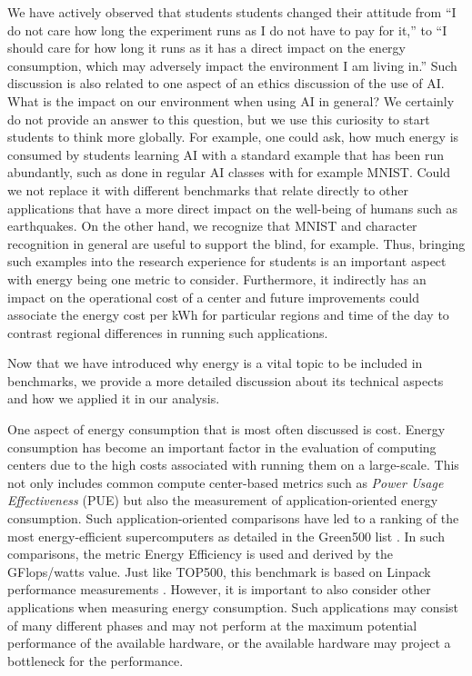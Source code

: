 \documentclass[utf8]{FrontiersinVancouver} %
\begin{document}
We have actively observed that students 
students changed their attitude from ``I do not care how long the experiment runs as I do not have to pay for it,'' to ``I should care for how long it runs as it has a direct impact on the energy consumption, which may adversely impact the environment I am living in.''
Such discussion is also related to one aspect of an ethics discussion of the use of AI. What is the impact on our environment when using AI in general? We certainly do not provide an answer to this question, but we use this curiosity to start students to think more globally. For example, one could ask, how much energy is consumed by students learning AI with a standard example that has been run abundantly, such as done in regular AI classes with for example MNIST. Could we not replace it with different benchmarks that relate directly to other applications that have a more direct impact on the well-being of humans such as earthquakes. On the other hand, we recognize that MNIST and character recognition in general are useful to support the blind, for example. Thus, bringing such examples into the research experience for students is an important aspect with energy being one metric to consider. Furthermore, it indirectly has an impact on the operational cost of a center and future improvements could associate the energy cost per kWh for particular regions and time of the day to contrast regional differences in running such applications.
 
Now that we have introduced why energy is a vital topic to be included in benchmarks, we provide a more detailed discussion about its technical aspects and how we applied it in our analysis.

One aspect of energy consumption that is most often discussed is cost.
Energy consumption has become an important factor in the evaluation of computing centers due to the high costs associated with running them on a large-scale. This not only includes common compute center-based metrics such as {\em Power Usage Effectiveness} (PUE) but also the measurement of application-oriented energy consumption.  Such application-oriented comparisons have led to a ranking of the most energy-efficient supercomputers as detailed in the Green500 list \citep{green500}. In such comparisons, the metric Energy Efficiency is used and derived by the GFlops/watts value. Just like TOP500, this benchmark is based on Linpack performance measurements \cite{www-top500}.  However, it is important to also consider other applications when measuring energy consumption. Such applications may consist of many different phases and may not perform at the maximum potential performance of the available hardware, or the available hardware may project a bottleneck for the performance.
\end{document}

